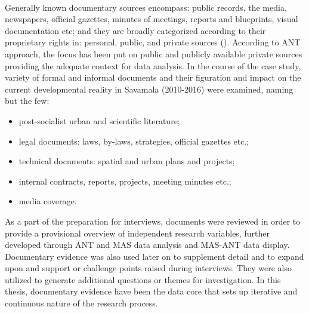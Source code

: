 \documentclass[11pt]{report}
\begin{document}
\\
Generally known documentary sources encompass: public records, the media, newspapers, official gazettes, minutes of meetings, reports and blueprints, visual documentation etc; and they are broadly categorized according to their proprietary rights in: personal, public, and private sources (\cite{(Payne and Payne, 2004)}). According to ANT approach, the focus has been put on public and publicly available private sources providing the adequate context for data analysis. In the course of the case study, variety of formal and informal documents and their figuration and impact on the current developmental reality in Savamala (2010-2016) were examined, naming but the few:
\begin{itemize}
\item post-socialist urban and scientific literature;
\item legal documents: laws, by-laws, strategies, official gazettes etc.;
\item technical documents: spatial and urban plans and projects;
\item internal contracts, reports, projects, meeting minutes etc.;
\item media coverage. 
\end{itemize}

As  a  part  of  the  preparation  for  interviews,  documents  were  reviewed  in  order  to provide  a provisional overview of independent research variables, further developed through ANT and MAS data analysis and MAS-ANT data display. Documentary evidence was also used later on to supplement detail and to expand upon and support or challenge points raised during interviews. They were also utilized to generate additional questions or themes for investigation. In this thesis, documentary evidence have been the data core that sets up iterative and continuous nature of the research process. 
\end{document}
